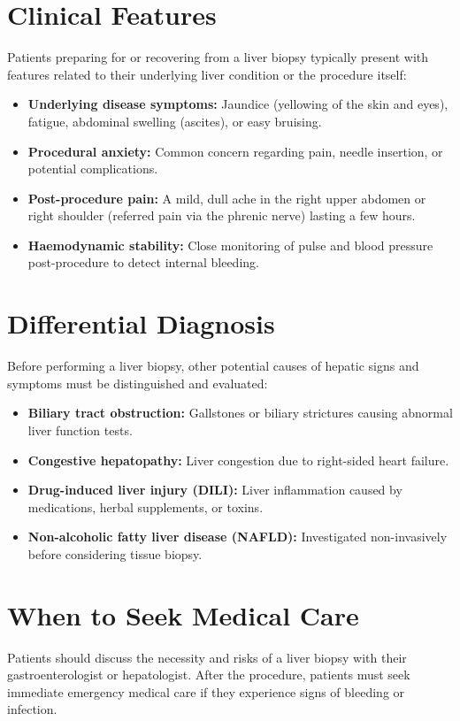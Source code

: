 \section*{Clinical Features}
Patients preparing for or recovering from a liver biopsy typically present with features related to their underlying liver condition or the procedure itself:

\begin{itemize}
    \item \textbf{Underlying disease symptoms:} Jaundice (yellowing of the skin and eyes), fatigue, abdominal swelling (ascites), or easy bruising.
    \item \textbf{Procedural anxiety:} Common concern regarding pain, needle insertion, or potential complications.
    \item \textbf{Post-procedure pain:} A mild, dull ache in the right upper abdomen or right shoulder (referred pain via the phrenic nerve) lasting a few hours.
    \item \textbf{Haemodynamic stability:} Close monitoring of pulse and blood pressure post-procedure to detect internal bleeding.
\end{itemize}

\section*{Differential Diagnosis}
Before performing a liver biopsy, other potential causes of hepatic signs and symptoms must be distinguished and evaluated:

\begin{itemize}
    \item \textbf{Biliary tract obstruction:} Gallstones or biliary strictures causing abnormal liver function tests.
    \item \textbf{Congestive hepatopathy:} Liver congestion due to right-sided heart failure.
    \item \textbf{Drug-induced liver injury (DILI):} Liver inflammation caused by medications, herbal supplements, or toxins.
    \item \textbf{Non-alcoholic fatty liver disease (NAFLD):} Investigated non-invasively before considering tissue biopsy.
\end{itemize}

\section*{When to Seek Medical Care}
Patients should discuss the necessity and risks of a liver biopsy with their gastroenterologist or hepatologist. After the procedure, patients must seek immediate emergency medical care if they experience signs of bleeding or infection.

